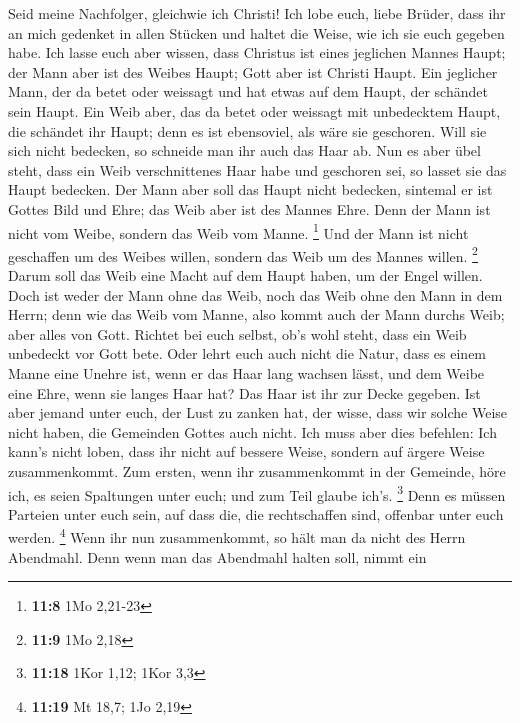 Seid meine Nachfolger, gleichwie ich Christi!
 Ich lobe euch, liebe Brüder, dass ihr an mich gedenket in
allen Stücken und haltet die Weise, wie ich sie euch gegeben habe.
 Ich lasse euch aber wissen, dass Christus ist eines
jeglichen Mannes Haupt; der Mann aber ist des Weibes Haupt; Gott aber
ist Christi Haupt.  Ein jeglicher Mann, der da betet oder
weissagt und hat etwas auf dem Haupt, der schändet sein Haupt.
 Ein Weib aber, das da betet oder weissagt mit unbedecktem
Haupt, die schändet ihr Haupt; denn es ist ebensoviel, als wäre sie
geschoren.  Will sie sich nicht bedecken, so schneide man
ihr auch das Haar ab. Nun es aber übel steht, dass ein Weib
verschnittenes Haar habe und geschoren sei, so lasset sie das Haupt
bedecken.  Der Mann aber soll das Haupt nicht bedecken,
sintemal er ist Gottes Bild und Ehre; das Weib aber ist des Mannes Ehre.
 Denn der Mann ist nicht vom Weibe, sondern das Weib vom
Manne. \footnote{\textbf{11:8} 1Mo 2,21-23}  Und der Mann
ist nicht geschaffen um des Weibes willen, sondern das Weib um des
Mannes willen. \footnote{\textbf{11:9} 1Mo 2,18}  Darum
soll das Weib eine Macht auf dem Haupt haben, um der Engel willen.
 Doch ist weder der Mann ohne das Weib, noch das Weib
ohne den Mann in dem Herrn;  denn wie das Weib vom Manne,
also kommt auch der Mann durchs Weib; aber alles von Gott.
 Richtet bei euch selbst, ob's wohl steht, dass ein Weib
unbedeckt vor Gott bete.  Oder lehrt euch auch nicht die
Natur, dass es einem Manne eine Unehre ist, wenn er das Haar lang
wachsen lässt,  und dem Weibe eine Ehre, wenn sie langes
Haar hat? Das Haar ist ihr zur Decke gegeben.  Ist aber
jemand unter euch, der Lust zu zanken hat, der wisse, dass wir solche
Weise nicht haben, die Gemeinden Gottes auch nicht.  Ich
muss aber dies befehlen: Ich kann's nicht loben, dass ihr nicht auf
bessere Weise, sondern auf ärgere Weise zusammenkommt. 
Zum ersten, wenn ihr zusammenkommt in der Gemeinde, höre ich, es seien
Spaltungen unter euch; und zum Teil glaube ich's. \footnote{\textbf{11:18}
  1Kor 1,12; 1Kor 3,3}  Denn es müssen Parteien unter
euch sein, auf dass die, die rechtschaffen sind, offenbar unter euch
werden. \footnote{\textbf{11:19} Mt 18,7; 1Jo 2,19}  Wenn
ihr nun zusammenkommt, so hält man da nicht des Herrn Abendmahl.
 Denn wenn man das Abendmahl halten soll, nimmt ein
